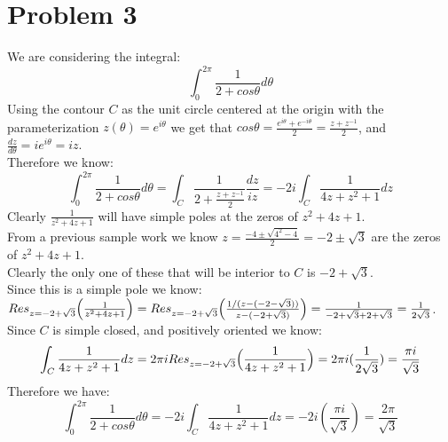 \documentclass{article}
\begin{document}
\newpage
\section*{Problem 3}
\begin{center}
    \doublespacing
    We are considering the integral:
    \[\int _0^{2\pi}\frac{1}{2 + cos\theta} d\theta\]
    Using the contour $C$ as the unit circle centered at the origin with the parameterization $z(\theta) = e^{i\theta}$ we get that $cos\theta =\frac{e^{i\theta} + e^{-i\theta}}{2} =\frac{z + z^{-1}}{2}$, and $\frac{dz}{d\theta} = ie^{i\theta} = iz$.
    \\Therefore we know:
    \[\int _0^{2\pi}\frac{1}{2 + cos\theta} d\theta =\int _C\frac{1}{2 +\frac{z + z^{-1}}{2}}\frac{dz}{iz} = -2i\int _C\frac{1}{4z + z^2 + 1} dz\]
    Clearly $\frac{1}{z^2 + 4z + 1}$ will have simple poles at the zeros of $z^2 + 4z + 1$.
    \\From a previous sample work we know $z =\frac{-4\pm\sqrt{4^2 - 4}}{2} = -2\pm\sqrt{3}$ are the zeros of $z^2 + 4z + 1$.
    \\Clearly the only one of these that will be interior to $C$ is $-2 +\sqrt{3}$.
    \\Since this is a simple pole we know:
    \\$Res _{z=-2+\sqrt{3}}\Big{(}\frac{1}{z^2 + 4z + 1}\Big{)} = Res _{z=-2+\sqrt{3}}\Big{(}\frac{1/(z - (-2-\sqrt{3}))}{z - (-2 +\sqrt{3})}\Big{)} =\frac{1}{-2 +\sqrt{3} + 2 +\sqrt{3}} =\frac{1}{2\sqrt{3}}$.
    \\Since $C$ is simple closed, and positively oriented we know:
    \[\int _C\frac{1}{4z + z^2 + 1} dz = 2\pi i Res_{z = -2+\sqrt{3}}\Big{(}\frac{1}{4z + z^2 + 1}\Big{)} = 2\pi i(\frac{1}{2\sqrt{3}}) =\frac{\pi i}{\sqrt{3}}\]
    Therefore we have:
    \[\int _0^{2\pi}\frac{1}{2 + cos\theta} d\theta = -2i\int _C\frac{1}{4z + z^2 + 1} dz = -2i(\frac{\pi i}{\sqrt{3}}) =\frac{2\pi}{\sqrt{3}}\]
    \qedsymbol
\end{center}


\newpage
\end{document}
